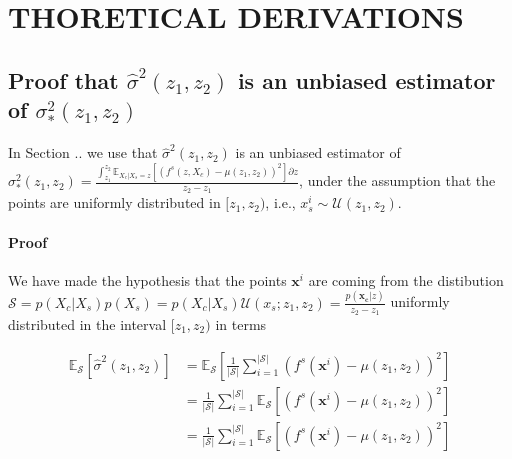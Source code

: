 \documentclass[twoside]{article}
\newcommand{\xc}{\mathbf{x_c}}
\newcommand{\xb}{\mathbf{x}}
\begin{document}
%

%

\onecolumn
{}

\section{THORETICAL DERIVATIONS}

\subsection{Proof that \(\hat{\sigma}^2(z_1, z_2)\) is an unbiased estimator of \(\sigma_*^2(z_1, z_2)\)}

In Section .. we use that \(\hat{\sigma}^2(z_1, z_2)\) is an unbiased
estimator of
\(\sigma^2_*(z_1, z_2) = \frac{\int_{z_1}^{z_2} \mathbb{E}_{X_c|X_s=z}
  \left [ (f^s(z, X_c) - \mu(z_1, z_2) )^2 \right] \partial z}{z_2 -
  z_1} \), under the assumption that the points are uniformly distributed in \([z_1, z_2)\),
i.e., \(x_s^i \sim \mathcal{U}(z_1, z_2)\).

\paragraph{Proof}

We have made the hypothesis that the points \(\xb^i\) are
coming from the distibution
\(\mathcal{S} = p(X_c|X_s) p(X_s) = p(X_c|X_s) \mathcal{U}(x_s; z_1,
z_2)= \frac{p(\xc|z)}{z_2 - z_1}\) uniformly distributed in the interval \([z_1, z_2)\) in terms

\begin{align}
  \mathbb{E}_\mathcal{S}[\hat{\sigma}^2(z_1, z_2)] &= \mathbb{E}_\mathcal{S}[\frac{1}{|\mathcal{S}|} \sum_{i=1}^{|\mathcal{S}|} (f^s(\xb^i) - \mu(z_1, z_2))^2] \\
  & = \frac{1}{|\mathcal{S}|} \sum_{i=1}^{|\mathcal{S}|} \mathbb{E}_\mathcal{S}[(f^s(\xb^i) - \mu(z_1, z_2))^2]\\
  & = \frac{1}{|\mathcal{S}|} \sum_{i=1}^{|\mathcal{S}|} \mathbb{E}_\mathcal{S}[(f^s(\xb^i) - \mu(z_1, z_2))^2]\\
  \end{align}
\end{document}
